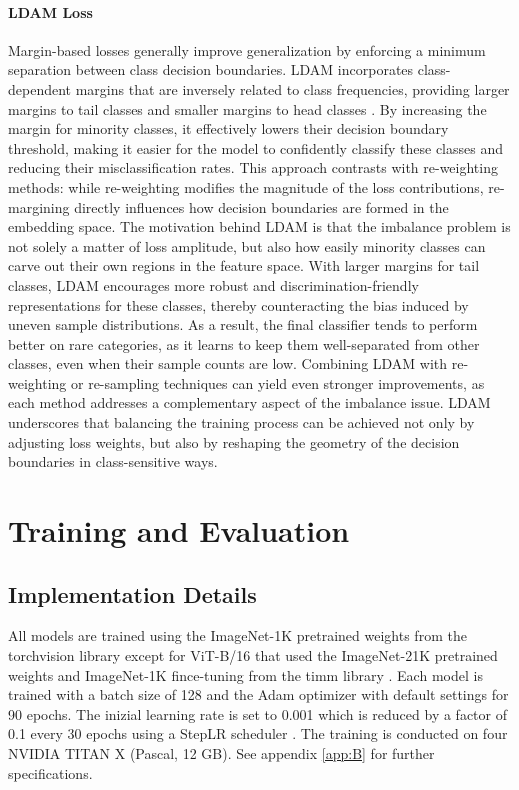 \paragraph{LDAM Loss}
Margin-based losses generally improve generalization by enforcing a minimum separation between class decision boundaries. LDAM incorporates class-dependent margins that are inversely related to class frequencies, providing larger margins to tail classes and smaller margins to head classes \cite{zhang2023deep}. By increasing the margin for minority classes, it effectively lowers their decision boundary threshold, making it easier for the model to confidently classify these classes and reducing their misclassification rates. This approach contrasts with re-weighting methods: while re-weighting modifies the magnitude of the loss contributions, re-margining directly influences how decision boundaries are formed in the embedding space. The motivation behind LDAM is that the imbalance problem is not solely a matter of loss amplitude, but also how easily minority classes can carve out their own regions in the feature space. With larger margins for tail classes, LDAM encourages more robust and discrimination-friendly representations for these classes, thereby counteracting the bias induced by uneven sample distributions. As a result, the final classifier tends to perform better on rare categories, as it learns to keep them well-separated from other classes, even when their sample counts are low. Combining LDAM with re-weighting or re-sampling techniques can yield even stronger improvements, as each method addresses a complementary aspect of the imbalance issue. LDAM underscores that balancing the training process can be achieved not only by adjusting loss weights, but also by reshaping the geometry of the decision boundaries in class-sensitive ways.


\section{Training and Evaluation}

\subsection{Implementation Details}
All models are trained using the ImageNet-1K pretrained weights from the torchvision library \cite{torchvision-resnet,pytorch_mobilenetv2,torchvision2024convnextbase} except for ViT-B/16 that used the ImageNet-21K pretrained weights and ImageNet-1K fince-tuning from the timm library \cite{huggingface2024vitbase}. Each model is trained with a batch size of 128 and the Adam optimizer \cite{kingma2017adammethodstochasticoptimization} with default settings for 90 epochs. The inizial learning rate is set to 0.001 which is reduced by a factor
of 0.1 every 30 epochs using a StepLR scheduler \cite{pytorch_steplr}. The training is conducted on four NVIDIA TITAN X (Pascal, 12 GB). See appendix \ref{app:B} for further specifications.

